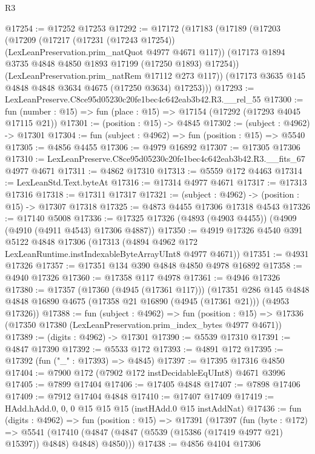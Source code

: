\begin{lexlean}{R3}
\begin{coremodule}
@17254 := @17252 @17253
@17292 := @17172
    (@17183
      (@17189
        (@17203
          (@17209
            (@17217 (@17231 (@17243 @17254)) (LexLeanPreservation.prim_natQuot @4977 @4671 @117))
            (@17173 @1894 @3735 @4848 @4850 @1893 @17199 (@17250 @1893) @17254))
          (LexLeanPreservation.prim_natRem @17112 @273 @117))
        (@17173 @3635 @145 @4848 @4848 @3634 @4675 (@17250 @3634) @17253)))
@17293 := LexLeanPreserve.C8ce95d05230c20fe1bec4c642eab3b42.R3.__rel_55
@17300 := fun (number : @15) => fun (place : @15) => @17154 (@17292 (@17293 @4045 @17115 @21))
@17301 := (position : @15) -> @4845
@17302 := (subject : @4962) -> @17301
@17304 := fun (subject : @4962) => fun (position : @15) => @5540
@17305 := @4856 @4455
@17306 := @4979 @16892
@17307 := @17305 @17306
@17310 := LexLeanPreserve.C8ce95d05230c20fe1bec4c642eab3b42.R3.__fits_67 @4977 @4671
@17311 := @4862 @17310
@17313 := @5559 @172 @4463
@17314 := LexLeanStd.Text.byteAt
@17316 := @17314 @4977 @4671
@17317 := @17313 @17316
@17318 := @17311 @17317
@17321 := (subject : @4962) -> (position : @15) -> @17307 @17318
@17325 := @4873 @4455 @17306 @17318 @4543
@17326 := @17140 @5008
@17336 := @17325 @17326 (@4893 (@4903 @4455)) (@4909 (@4910 (@4911 @4543) @17306 @4887))
@17350 := @4919
    @17326
    @4540
    @391
    @5122
    @4848
    @17306
    (@17313 (@4894 @4962 @172 LexLeanRuntime.instIndexableByteArrayUInt8 @4977 @4671))
@17351 := @4931 @17326
@17357 := @17351 @134 @390 @4848 @4850 @4978 @16892
@17358 := @4940 @17326
@17360 := @17358 @117 @4978
@17361 := @4946 @17326
@17380 := @17357
    (@17360 (@4945 (@17361 @117)))
    (@17351
      @286
      @145
      @4848
      @4848
      @16890
      @4675
      (@17358 @21 @16890 (@4945 (@17361 @21)))
      (@4953 @17326))
@17388 := fun (subject : @4962) =>
  fun (position : @15) => @17336 (@17350 @17380 (LexLeanPreservation.prim_index_bytes @4977 @4671))
@17389 := (digits : @4962) -> @17301
@17390 := @5539 @17310
@17391 := @4847 @17390
@17392 := @5533 @172
@17393 := @4891 @172
@17395 := @17392 (fun ("_" : @17393) => @4845)
@17397 := @17395 @17316 @4850
@17404 := @7900 @172 (@7902 @172 instDecidableEqUInt8) @4671 @3996
@17405 := @7899 @17404
@17406 := @17405 @4848
@17407 := @7898 @17406
@17409 := @7912 @17404 @4848
@17410 := @17407 @17409
@17419 := HAdd.hAdd.{0, 0, 0} @15 @15 @15 (instHAdd.{0} @15 instAddNat)
@17436 := fun (digits : @4962) =>
  fun (position : @15) =>
  @17391
    (@17397
      (fun (byte : @172) =>
      @5541 (@17410 (@4847 (@4847 (@5539 (@15386 (@17419 @4977 @21) @15397)) @4848) @4848) @4850)))
@17438 := @4856 @4104 @17306

\end{coremodule}
\end{lexlean}
